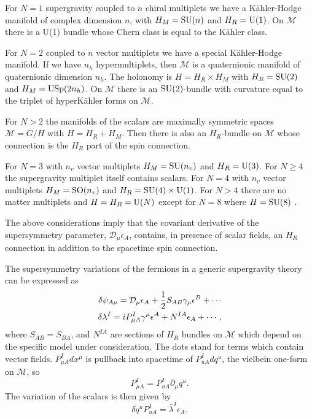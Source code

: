 \documentclass[a4paper,12pt]{article}
\begin{document}
For $N=1$  supergravity coupled to $n$ chiral multiplets we have a
K\"ahler-Hodge manifold of complex dimension $n$, with
$H_M=\mathrm{SU}(n)$ and $H_R=\mathrm{U}(1)$. On $\mathcal{M}$ there is a U(1)
bundle whose Chern class is equal to the K\"ahler class.

For $N=2$ coupled to $n$ vector multiplets we have a special
K\"ahler-Hodge manifold. If we have $n_h$
 hypermultiplets, then $\mathcal{M}$ is a quaternionic manifold of quaternionic dimension $n_h$. The
holonomy is $H=H_R\times H_M$ with $H_R=\mathrm{SU}(2)$ and
$H_M=\mathrm{USp}(2n_h)$. On $\mathcal{M}$ there is an $\mathrm{SU}(2)$-bundle
with curvature equal to the triplet of hyperK\"ahler forms on
$\mathcal{M}$.

For $N>2$ the manifolds of the scalars are maximally symmetric spaces $\mathcal{M}=G/H$ with
$H=H_R+H_M$. Then there is also an $H_R$-bundle on $\mathcal{M}$ whose connection is the $H_R$ part
of the spin connection.

For $N=3$ with $n_v$ vector multiplets $H_M=\mathrm{SU}(n_v)$ and $H_R=\mathrm{U}(3)$. For $N\geq 4$ the
supergravity multiplet itself contains scalars. For $N=4$ with $n_v$ vector multiplets
$H_M=\mathrm{SO}(n_v)$ and $H_R=\mathrm{SU}(4)\times \mathrm{U}(1)$. For $N>4$ there are no matter multiplets and
$H=H_R=\mathrm{U}(N)$ except for $N=8$ where $H=\mathrm{SU}(8)$ \cite{adf}.

The above considerations imply that the covariant derivative of
the supersymmetry parameter, $\mathcal{D}_\mu\epsilon_A$,
contains, in presence of scalar fields, an $H_R$ connection in
addition to the spacetime spin connection.

\bigskip

 The supersymmetry variations of the fermions in a generic supergravity theory can be expressed as
\cite{df}
 \begin{eqnarray} \delta\psi_{A\mu}=\mathcal{D}_\mu\epsilon_A+\frac 1 2
S_{AB}\gamma_\mu\epsilon^B+\cdots\noindent\\
 \delta\lambda^I=iP_{\mu A}^I\gamma^\mu\epsilon^A+
N^{IA}\epsilon_A+\cdots,\label{varfer}\end{eqnarray}
 where $S_{AB}=S_{BA}$,  and $N^{IA}$ are sections of  $H_R$ bundles on $\mathcal{M}$ which depend on
 the specific model under consideration. The dots stand for terms which contain vector fields.
 $P_{\mu A}^Idx^\mu$ is pullback  into spacetime of $P_{uA}^Idq^u$, the vielbein one-form on
$\mathcal{M}$, so $$P_{\mu A}^I=P_{uA}^I\partial_\mu q^u.$$ The variation of the scalars is then
given by
 $$\delta q^uP_{uA}^I=\bar \lambda^I\epsilon_A.$$
\end{document}
